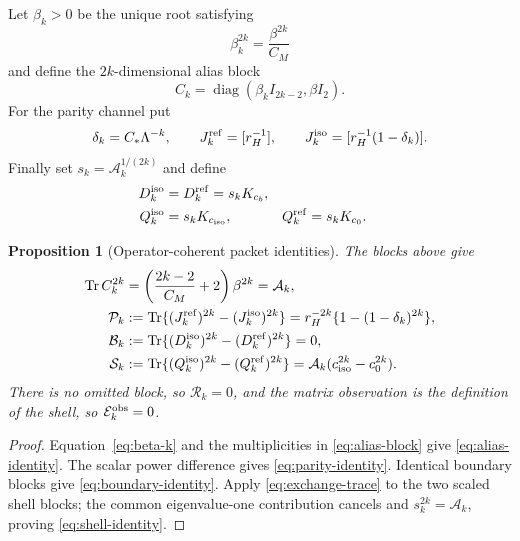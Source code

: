 \documentclass[11pt]{article}
\newtheorem{proposition}[theorem]{Proposition}
\theoremstyle{remark}
\newcommand{\Tr}{\operatorname{Tr}}
\newcommand{\cA}{\mathcal A}
\newcommand{\cB}{\mathcal B}
\newcommand{\cE}{\mathcal E}
\newcommand{\cP}{\mathcal P}
\newcommand{\cR}{\mathcal R}
\newcommand{\cS}{\mathcal S}
\begin{document}
Let $\beta_k>0$ be the unique root satisfying
\begin{equation}
 \beta_k^{2k}=\frac{\beta^{2k}}{C_M}
 \label{eq:beta-k}
\end{equation}
and define the $2k$-dimensional alias block
\begin{equation}
 C_k=\operatorname{diag}(\beta_k I_{2k-2},\beta I_2).
 \label{eq:alias-block}
\end{equation}
For the parity channel put
\begin{equation}
 \delta_k=C_*\Lambda^{-k},\qquad
 J_k^{\rm ref}=[r_H^{-1}],\qquad
 J_k^{\rm iso}=[r_H^{-1}(1-\delta_k)].
 \label{eq:parity-blocks}
\end{equation}
Finally set $s_k=\cA_k^{1/(2k)}$ and define
\begin{align}
 D_k^{\rm iso}&=D_k^{\rm ref}=s_kK_{c_b},
 \label{eq:boundary-blocks}\\
 Q_k^{\rm iso}&=s_kK_{c_{\rm iso}},
 &Q_k^{\rm ref}&=s_kK_{c_0}.
 \label{eq:shell-blocks}
\end{align}

\begin{proposition}[Operator-coherent packet identities]
The blocks above give
\begin{align}
 \Tr C_k^{2k}
 &=\left(\frac{2k-2}{C_M}+2\right)\beta^{2k}=\cA_k,
 \label{eq:alias-identity}\\
 \cP_k
 &:=\Tr\{(J_k^{\rm ref})^{2k}-(J_k^{\rm iso})^{2k}\}
 =r_H^{-2k}\{1-(1-\delta_k)^{2k}\},
 \label{eq:parity-identity}\\
 \cB_k
 &:=\Tr\{(D_k^{\rm iso})^{2k}-(D_k^{\rm ref})^{2k}\}=0,
 \label{eq:boundary-identity}\\
 \cS_k
 &:=\Tr\{(Q_k^{\rm iso})^{2k}-(Q_k^{\rm ref})^{2k}\}
 =\cA_k(c_{\rm iso}^{2k}-c_0^{2k}).
 \label{eq:shell-identity}
\end{align}
There is no omitted block, so $\cR_k=0$, and the matrix observation is the
definition of the shell, so $\cE_k^{\rm obs}=0$.
\end{proposition}

\begin{proof}
Equation~\eqref{eq:beta-k} and the multiplicities in
\eqref{eq:alias-block} give \eqref{eq:alias-identity}.  The scalar power
difference gives \eqref{eq:parity-identity}.  Identical boundary blocks give
\eqref{eq:boundary-identity}.  Apply \eqref{eq:exchange-trace} to the two
scaled shell blocks; the common eigenvalue-one contribution cancels and
$s_k^{2k}=\cA_k$, proving \eqref{eq:shell-identity}.
\end{proof}
\end{document}
